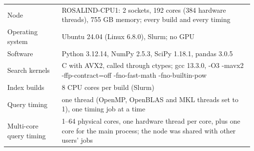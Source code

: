 \begin{tabular}{lp{}}
\toprule
 &  \\
\midrule
Node & ROSALIND-CPU1: 2 sockets, 192 cores (384 hardware threads), 755 GB memory; every build and every timing \\
Operating system & Ubuntu 24.04 (Linux 6.8.0), Slurm; no GPU \\
Software & Python 3.12.14, NumPy 2.5.3, SciPy 1.18.1, pandas 3.0.5 \\
Search kernels & C with AVX2, called through ctypes; gcc 13.3.0, -O3 -mavx2 -ffp-contract=off -fno-fast-math -fno-builtin-pow \\
Index builds & 8 CPU cores per build (Slurm) \\
Query timing & one thread (OpenMP, OpenBLAS and MKL threads set to 1), one timing job at a time \\
Multi-core query timing & 1--64 physical cores, one hardware thread per core, plus one core for the main process; the node was shared with other users' jobs \\
\bottomrule
\end{tabular}
